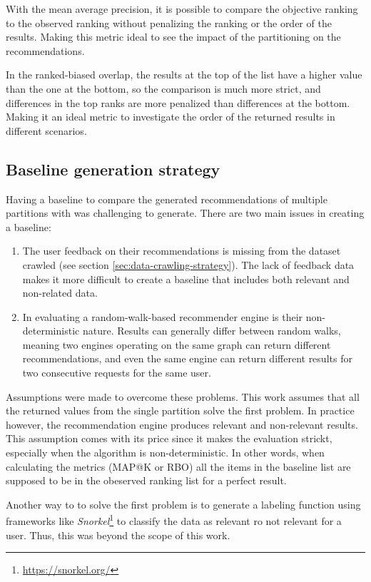 With the mean average precision, it is possible to compare the objective ranking to the observed ranking without penalizing the ranking or the order of the results. Making this metric ideal to see the impact of the partitioning on the recommendations.


In the ranked-biased overlap, the results at the top of the list have a higher value than the one at the bottom, so the comparison is much more strict, and differences in the top ranks are more penalized than differences at the bottom. Making it an ideal metric to investigate the order of the returned results in different scenarios.


\subsection{Baseline generation strategy}
\label{subsec:baseline-generation}

Having a baseline to compare the generated recommendations of multiple partitions with was challenging to generate. There are two main issues in creating a baseline:
\begin{enumerate}
    \item The user feedback on their recommendations is missing from the dataset crawled (see section \ref{sec:data-crawling-strategy}). The lack of feedback data makes it more difficult to create a baseline that includes both relevant and non-related data.
    
    \item In evaluating a random-walk-based recommender engine is their non-deterministic nature. Results can generally differ between random walks, meaning two engines operating on the same graph can return different recommendations, and even the same engine can return different results for two consecutive requests for the same user.
\end{enumerate}

Assumptions were made to overcome these problems. This work assumes that all the returned values from the single partition solve the first problem. In practice however, the recommendation engine produces relevant and non-relevant results. This assumption comes with its price since it makes the evaluation strickt, especially when the algorithm is non-deterministic. In other words, when calculating the metrics (MAP@K or RBO) all the items in the baseline list are supposed to be in the obeserved ranking list for a perfect result.


Another way to to solve the first problem is to generate a labeling function using frameworks like \emph{Snorkel}\footnote{\url{https://snorkel.org/}} to classify the data as relevant ro not relevant for a user. Thus, this was beyond the scope of this work.


